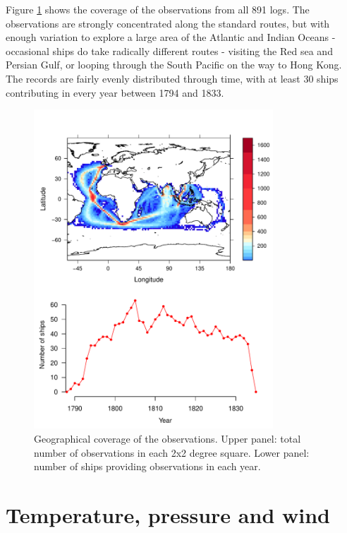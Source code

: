 \documentclass[CP]{copernicus}
\begin{document}
Figure \ref{Fsroc1} shows the coverage of the observations from all 891 logs. The observations are strongly concentrated along the standard routes, but with enough variation to explore a large area of the Atlantic and Indian Oceans - occasional ships do take radically different routes - visiting the Red sea and Persian Gulf, or looping through the South Pacific on the way to Hong Kong. The records are fairly evenly distributed through time, with at least 30 ships contributing in every year between 1794 and 1833.
\begin{figure}[!hbp]
\begin{center}
\includegraphics[angle=0, width=0.8\textwidth]{../figures/coverage}
\caption{Geographical coverage of the observations. Upper panel: total number of observations in each 2x2 degree square. Lower panel: number of ships providing observations in each year.}
\label{Fsroc1}
\end{center}
\end{figure}

\section{Temperature, pressure and wind}
\end{document}
